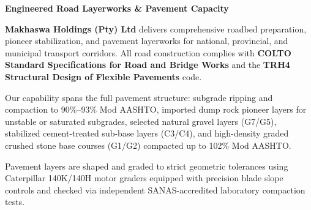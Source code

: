 \hypertarget{sec:roads}{}

\noindent
\begin{minipage}[t]{0.62\textwidth}
    \vspace{0pt}
    {\large\bfseries\color{mhnavy} Engineered Road Layerworks \& Pavement Capacity}
    \vspace{0.12cm}

    {\fontsize{9pt}{13pt}\selectfont\color{mhtext}
    \textbf{Makhaswa Holdings (Pty) Ltd} delivers comprehensive roadbed preparation, pioneer stabilization, and pavement layerworks for national, provincial, and municipal transport corridors. All road construction complies with \textbf{COLTO Standard Specifications for Road and Bridge Works} and the \textbf{TRH4 Structural Design of Flexible Pavements} code.
    }

    \vspace{0.22cm}

    {\fontsize{9pt}{13pt}\selectfont\color{mhtext}
    Our capability spans the full pavement structure: subgrade ripping and compaction to 90\%--93\% Mod AASHTO, imported dump rock pioneer layers for unstable or saturated subgrades, selected natural gravel layers (G7/G5), stabilized cement-treated sub-base layers (C3/C4), and high-density graded crushed stone base courses (G1/G2) compacted up to 102\% Mod AASHTO.
    }

    \vspace{0.22cm}

    {\fontsize{9pt}{13pt}\selectfont\color{mhtext}
    Pavement layers are shaped and graded to strict geometric tolerances using Caterpillar 140K/140H motor graders equipped with precision blade slope controls and checked via independent SANAS-accredited laboratory compaction tests.
    }
\end{minipage}
\hfill
